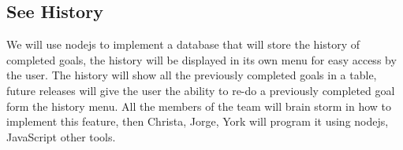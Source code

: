 \documentclass[a4paper]{article}
\begin{document}
\subsection{See History}
We will use nodejs to implement a database that will store the history of completed goals, the history will be displayed in its own menu for easy access by the user.
\newline
\newline
The history will show all the previously completed goals in a table, future releases will give the user the ability to re-do a previously completed goal form the history menu.
\newline
\newline
All the members of the team will brain storm in how to implement this feature, then Christa, Jorge, York will program it using nodejs, JavaScript other tools.
\end{document}
